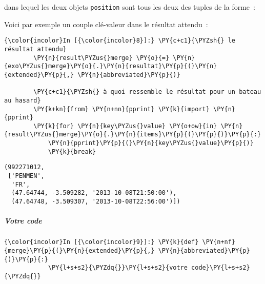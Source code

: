 \begin{Shaded}
\begin{Highlighting}[frame=lines,framerule=0.6mm,rulecolor=\color{asisframecolor}]
 \OperatorTok{->}
\end{Highlighting}
\end{Shaded}

dans lequel les deux objets \texttt{position} sont tous les deux des
tuples de la forme~:

\begin{Shaded}
\begin{Highlighting}[frame=lines,framerule=0.6mm,rulecolor=\color{asisframecolor}]
\end{Highlighting}
\end{Shaded}

    Voici par exemple un couple clé-valeur dans le résultat attendu~:

    \begin{Verbatim}[commandchars=\\\{\},frame=single,framerule=0.3mm,rulecolor=\color{cellframecolor}]
{\color{incolor}In [{\color{incolor}8}]:} \PY{c+c1}{\PYZsh{} le résultat attendu}
        \PY{n}{result\PYZus{}merge} \PY{o}{=} \PY{n}{exo\PYZus{}merge}\PY{o}{.}\PY{n}{resultat}\PY{p}{(}\PY{n}{extended}\PY{p}{,} \PY{n}{abbreviated}\PY{p}{)}
        
        \PY{c+c1}{\PYZsh{} à quoi ressemble le résultat pour un bateau au hasard}
        \PY{k+kn}{from} \PY{n+nn}{pprint} \PY{k}{import} \PY{n}{pprint}
        \PY{k}{for} \PY{n}{key\PYZus{}value} \PY{o+ow}{in} \PY{n}{result\PYZus{}merge}\PY{o}{.}\PY{n}{items}\PY{p}{(}\PY{p}{)}\PY{p}{:}
            \PY{n}{pprint}\PY{p}{(}\PY{n}{key\PYZus{}value}\PY{p}{)}
            \PY{k}{break}
\end{Verbatim}


    \begin{Verbatim}[commandchars=\\\{\},frame=single,framerule=0.3mm,rulecolor=\color{cellframecolor}]
(992271012,
 ['PENMEN',
  'FR',
  (47.64744, -3.509282, '2013-10-08T21:50:00'),
  (47.64748, -3.509307, '2013-10-08T22:56:00')])
\end{Verbatim}

    \hypertarget{votre-code}{%
\subparagraph{Votre code}\label{votre-code}}

    \begin{Verbatim}[commandchars=\\\{\},frame=single,framerule=0.3mm,rulecolor=\color{cellframecolor}]
{\color{incolor}In [{\color{incolor}9}]:} \PY{k}{def} \PY{n+nf}{merge}\PY{p}{(}\PY{n}{extended}\PY{p}{,} \PY{n}{abbreviated}\PY{p}{)}\PY{p}{:}
            \PY{l+s+s2}{\PYZdq{}}\PY{l+s+s2}{votre code}\PY{l+s+s2}{\PYZdq{}}
\end{Verbatim}



